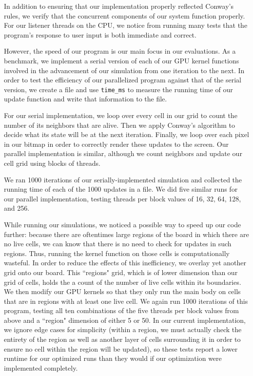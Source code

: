\documentclass[12pt]{article}
\begin{document}
    In addition to ensuring that our implementation properly reflected Conway's rules, we verify that the concurrent components of our system function properly. For our listener threads on the CPU, we notice from running many tests that the program's response to user input is both immediate and correct. 
    
    However, the speed of our program is our main focus in our evaluations. As a benchmark, we implement a serial version of each of our GPU kernel functions involved in the advancement of our simulation from one iteration to the next. In order to test the efficiency of our parallelized program against that of the serial version, we create a file and use \texttt{time\_ms} to measure the running time of our update function and write that information to the file. 
    
    For our serial implementation, we loop over every cell in our grid to count the number of its neighbors that are alive. Then we apply Conway's algorithm to decide what its state will be at the next iteration. Finally, we loop over each pixel in our bitmap in order to correctly render these updates to the screen. Our parallel implementation is similar, although we count neighbors and update our cell grid using blocks of threads. 

    We ran 1000 iterations of our serially-implemented simulation and collected the running time of each of the 1000 updates in a file. We did five similar runs for our parallel implementation, testing threads per block values of 16, 32, 64, 128, and 256.

    While running our simulations, we noticed a possible way to speed up our code further: because there are oftentimes large regions of the board in which there are no live cells, we can know that there is no need to check for updates in such regions. Thus, running the kernel function on those cells is computationally wasteful. In order to reduce the effects of this inefficiency, we overlay yet another grid onto our board. This ``regions" grid, which is of lower dimension than our grid of cells, holds the a count of the number of live cells within its boundaries. We then modify our GPU kernels so that they only run the main body on cells that are in regions with at least one live cell. We again run 1000 iterations of this program, testing all ten combinations of the five threads per block values from above and a ``region" dimension of either 5 or 50. In our current implementation, we ignore edge cases for simplicity (within a region, we must actually check the entirety of the region as well as another layer of cells surrounding it in order to ensure no cell within the region will be updated), so these tests report a lower runtime for our optimized runs than they would if our optimization were implemented completely.
    
\end{document}

